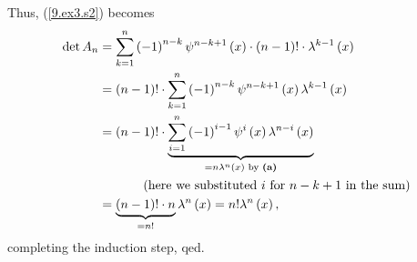 \documentclass[numbers=enddot,12pt,final,onecolumn,notitlepage]{scrartcl}%
\begin{document}
Thus, (\ref{9.ex3.s2}) becomes%
\begin{align*}
\det A_{n}  &  =\sum_{k=1}^{n}\left(  -1\right)  ^{n-k}\psi^{n-k+1}\left(
x\right)  \cdot\left(  n-1\right)  !\cdot\lambda^{k-1}\left(  x\right) \\
&  =\left(  n-1\right)  !\cdot\sum_{k=1}^{n}\left(  -1\right)  ^{n-k}%
\psi^{n-k+1}\left(  x\right)  \lambda^{k-1}\left(  x\right) \\
&  =\left(  n-1\right)  !\cdot\underbrace{\sum_{i=1}^{n}\left(  -1\right)
^{i-1}\psi^{i}\left(  x\right)  \lambda^{n-i}\left(  x\right)  }%
_{=n\lambda^{n}\left(  x\right)  \text{ by \textbf{(a)}}}\\
&  \ \ \ \ \ \ \ \ \ \ \left(  \text{here we substituted }i\text{ for
}n-k+1\text{ in the sum}\right) \\
&  =\underbrace{\left(  n-1\right)  !\cdot n}_{=n!}\lambda^{n}\left(
x\right)  =n!\lambda^{n}\left(  x\right)  ,
\end{align*}
completing the induction step, qed.
\end{document}
